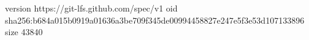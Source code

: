version https://git-lfs.github.com/spec/v1
oid sha256:b684a015b0919a01636a3be709f345de00994458827e247e5f3e53d107133896
size 43840
